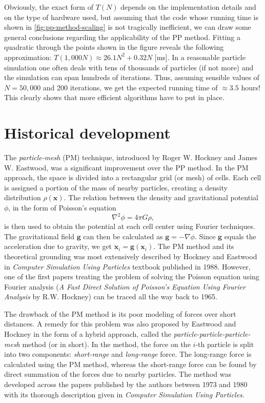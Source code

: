 Obviously, the exact form of $T(N)$ depends on the implementation details and on the type of hardware used, but assuming that the code whose running time is shown in \autoref{fig:pp-method-scaling} is not tragically inefficient, we can draw some general conclusions regarding the applicability of the PP method.
Fitting a quadratic through the points shown in the figure reveals the following approximation: $T(1{,}000N) \approx 26.1N^2 + 0.32N$ [ms].
In a reasonable particle simulation one often deals with tens of thousands of particles (if not more) and the simulation can span hundreds of iterations.
Thus, assuming sensible values of $N = 50{,}000$ and 200 iterations, we get the expected running time of $\approx 3.5$ hours!
This clearly shows that more efficient algorithms have to put in place.

\section{Historical development}\label{sec:historical-development}
The \textit{particle-mesh} (PM) technique, introduced by Roger W. Hockney and James W. Eastwood, was a significant improvement over the PP method.
In the PM approach, the space is divided into a rectangular grid (or mesh) of cells.
Each cell is assigned a portion of the mass of nearby particles, creating a density distribution $\rho(\mathbf{x})$.
The relation between the density and gravitational potential $\phi$, in the form of Poisson's equation
\begin{equation}\label{eq:poisson}
    \nabla^2\phi = 4\pi G \rho,
\end{equation}
is then used to obtain the potential at each cell center using Fourier techniques.
The gravitational field $\mathbf{g}$ can then be calculated as $\mathbf{g} = -\nabla \phi$.
Since $\mathbf{g}$ equals the acceleration due to gravity, we get $\ddot{\mathbf{x}}_i = \mathbf{g}(\mathbf{x}_i)$.
The PM method and its theoretical grounding was most extensively described by Hockney and Eastwood in \textit{Computer Simulation Using Particles} textbook published in 1988.
However, one of the first papers treating the problem of solving the Poisson equation using Fourier analysis (\textit{A Fast Direct Solution of Poisson's Equation Using Fourier Analysis} by R.W. Hockney) can be traced all the way back to 1965.

The drawback of the PM method is its poor modeling of forces over short distances.
A remedy for this problem was also proposed by Eastwood and Hockney in the form of a hybrid approach, called the \textit{particle-particle-particle-mesh} method (or \PThreeM{} in short).
In the \PThreeM{} method, the force on the $i$-th particle is split into two components: \textit{short-range} and \textit{long-range} force.
The long-range force is calculated using the PM method, whereas the short-range force can be found by direct summation of the forces due to nearby particles.
The \PThreeM{} method was developed across the papers published by the authors between 1973 and 1980 with its thorough description given in \textit{Computer Simulation Using Particles}.

